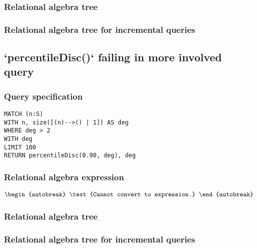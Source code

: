 \subsubsection*{Relational algebra tree}


\subsubsection*{Relational algebra tree for incremental queries}


\subsection{`percentileDisc()` failing in more involved query}

\subsubsection*{Query specification}

\begin{lstlisting}
MATCH (n:S)
WITH n, size([(n)-->() | 1]) AS deg
WHERE deg > 2
WITH deg
LIMIT 100
RETURN percentileDisc(0.90, deg), deg
\end{lstlisting}

\subsubsection*{Relational algebra expression}

\begin{align*}
\begin{autobreak}
\text{Cannot convert to expression.}
\end{autobreak}
\end{align*}

\subsubsection*{Relational algebra tree}


\subsubsection*{Relational algebra tree for incremental queries}

